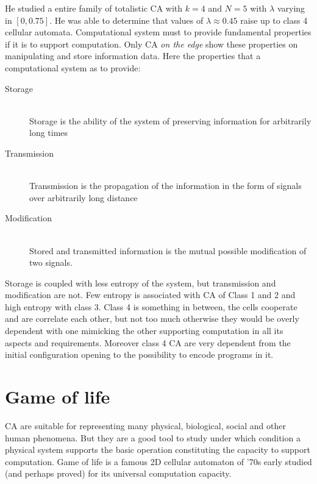 He studied a entire family of totalistic CA with $k=4
$ and $N=5$ with $\lambda$
varying in $[0,0.75]$. He was able to determine that values
of $\lambda\approx0.45$ raise up to class 4 cellular
automata.
Computational system must to provide fundamental properties if it is
to support computation. Only CA  \emph{on the edge} show these properties on
manipulating and store information data.
Here the properties that a computational system as to provide:
\begin{description}
  \item[Storage] \hfill \\
  Storage is the ability of the system of preserving information for
arbitrarily long times
  \item[Transmission] \hfill \\
  Transmission is the propagation of the information in the
form of signals over arbitrarily long distance
  \item[Modification] \hfill \\
Stored and transmitted
information is the mutual possible modification of two signals.

\end{description}

Storage is coupled with less entropy of the system, but transmission and
modification are not. Few entropy is associated with CA of Class 1 and 2 and
high entropy with class 3. Class 4 is something in between, the cells cooperate
and are correlate each other, but not too much otherwise they would be overly
dependent with one mimicking the other supporting computation in all its aspects
and requirements. Moreover class 4 CA are very dependent from the initial
configuration opening to the possibility to encode programs in it.

\section{Game of life}
\label{sect:GOL}
CA are suitable for representing many physical, biological, social and other
human phenomena. But they are a good tool to study under which condition a
physical system supports the basic operation constituting the capacity to
support computation. Game of life is a famous 2D
cellular automaton of '70s early studied (and perhaps proved) for its universal
computation capacity.



